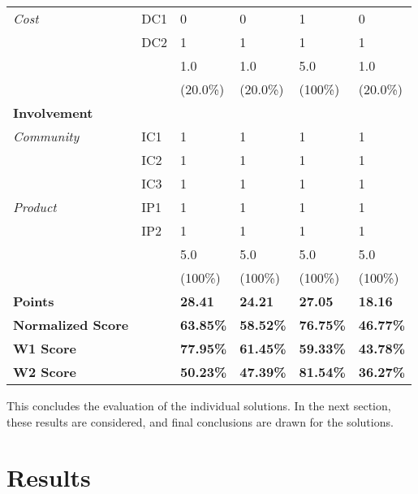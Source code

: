 \begin{longtable}{@{\extracolsep{\fill}}llllll@{}}
        \textit{Cost}          & DC1 & 0 & 0 & 1 & 0 \\
                               & DC2 & 1 & 1 & 1 & 1 \\     
                               \hline
                               && 1.0 & 1.0 & 5.0 & 1.0 \\
                               && (20.0\%) & (20.0\%) & (100\%) & (20.0\%) \\
                               \midrule
        \textbf{Involvement} &&&&&\\
        \textit{Community}     & IC1 & 1 & 1 & 1 & 1 \\
                               & IC2 & 1 & 1 & 1 & 1 \\                       
                               & IC3 & 1 & 1 & 1 & 1 \\                       
        \textit{Product}       & IP1 & 1 & 1 & 1 & 1 \\
                               & IP2 & 1 & 1 & 1 & 1 \\    
                               \hline
                               && 5.0 & 5.0 & 5.0 & 5.0 \\                        
                               && (100\%) & (100\%) & (100\%) & (100\%) \\
        \hline\hline
        \textbf{Points} & & \textbf{28.41} & \textbf{24.21} & \textbf{27.05} & \textbf{18.16} \\
        \textbf{Normalized Score} & & \textbf{63.85\%} & \textbf{58.52\%} & \textbf{76.75\%} & \textbf{46.77\%} \\
        \textbf{W1 Score} & & \textbf{77.95\%} & \textbf{61.45\%} & \textbf{59.33\%} & \textbf{43.78\%} \\
        \textbf{W2 Score} & & \textbf{50.23\%} & \textbf{47.39\%} & \textbf{81.54\%} & \textbf{36.27\%} \\
        \bottomrule
    \end{longtable}

    This concludes the evaluation of the individual solutions. In the next section, these results are considered, and final conclusions are drawn for the solutions.
    
	\section{Results}
	
